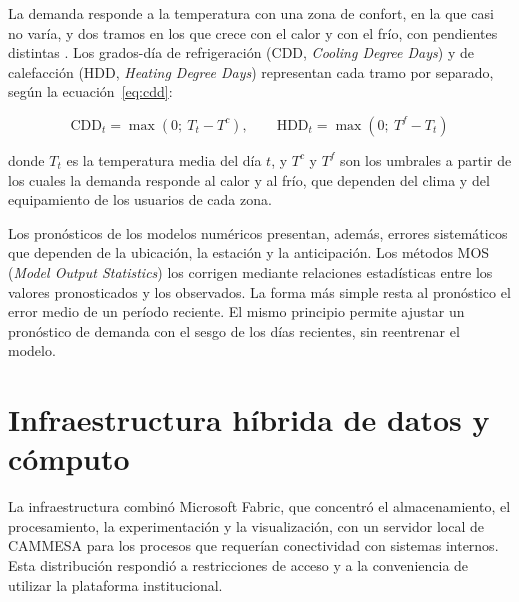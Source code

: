 La demanda responde a la temperatura con una zona de confort, en la que casi no varía, y dos tramos en los que crece con el calor y con el frío, con pendientes distintas \cite{valor2001temperature}. Los grados-día de refrigeración (CDD, \textit{Cooling Degree Days}) y de calefacción (HDD, \textit{Heating Degree Days}) representan cada tramo por separado, según la ecuación~\ref{eq:cdd}:

\begin{equation}
	\mathrm{CDD}_{t} = \max\left(0;\ T_{t} - T^{c}\right), \qquad \mathrm{HDD}_{t} = \max\left(0;\ T^{f} - T_{t}\right)
	\label{eq:cdd}
\end{equation}

\noindent donde $T_{t}$ es la temperatura media del día $t$, y $T^{c}$ y $T^{f}$ son los umbrales a partir de los cuales la demanda responde al calor y al frío, que dependen del clima y del equipamiento de los usuarios de cada zona.

Los pronósticos de los modelos numéricos presentan, además, errores sistemáticos que dependen de la ubicación, la estación y la anticipación. Los métodos MOS (\textit{Model Output Statistics}) \cite{glahn1972mos} los corrigen mediante relaciones estadísticas entre los valores pronosticados y los observados. La forma más simple resta al pronóstico el error medio de un período reciente. El mismo principio permite ajustar un pronóstico de demanda con el sesgo de los días recientes, sin reentrenar el modelo.

\section{Infraestructura híbrida de datos y cómputo}
\label{sec:infraestructura_computo}

La infraestructura combinó Microsoft Fabric, que concentró el almacenamiento, el procesamiento, la experimentación y la visualización, con un servidor local de CAMMESA para los procesos que requerían conectividad con sistemas internos. Esta distribución respondió a restricciones de acceso y a la conveniencia de utilizar la plataforma institucional.


